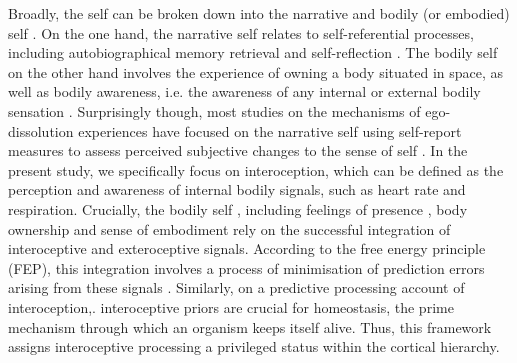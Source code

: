 \documentclass{article}
\begin{document}
Broadly, the self can be broken down into the narrative and bodily (or embodied) self \parencite{gallagher2000philosophical}.
On the one hand, the narrative self relates to self-referential processes, including autobiographical memory retrieval and self-reflection \parencite{milliere2018psychedelics, milliere2017looking}.%
The bodily self on the other hand involves the experience of owning a body situated in space, as well as bodily awareness, i.e. the awareness of any internal or external bodily sensation \parencite{legrand2006bodily, seth2013interoceptive}. %
Surprisingly though, most studies on the mechanisms of ego-dissolution experiences have focused on the narrative self using self-report measures to assess perceived subjective changes to the sense of self \parencite{ho2020bodily-self-psy}. 
In the present study, we specifically focus on interoception, which can be defined as the perception and awareness of internal bodily signals, such as heart rate and respiration. 
Crucially, the bodily self \parencite{allen2018body, park2019bodily-self-multisens}, including feelings of presence \parencite{seth2012interoceptive}, body ownership \parencite{apps2014free} and sense of embodiment \parencite{allen2018cognitivismEmbodied} rely on the successful integration of interoceptive and exteroceptive signals. %
According to the free energy principle (FEP), this integration involves a process of minimisation of prediction errors arising from these signals \parencite{apps2014free}.
Similarly, on a predictive processing account of interoception,\parencite{allen2018body, allen2018cognitivismEmbodied}.
interoceptive priors are crucial for homeostasis, the prime mechanism through which an organism keeps itself alive. Thus, this framework assigns interoceptive processing a privileged status within the cortical hierarchy.
\end{document}
